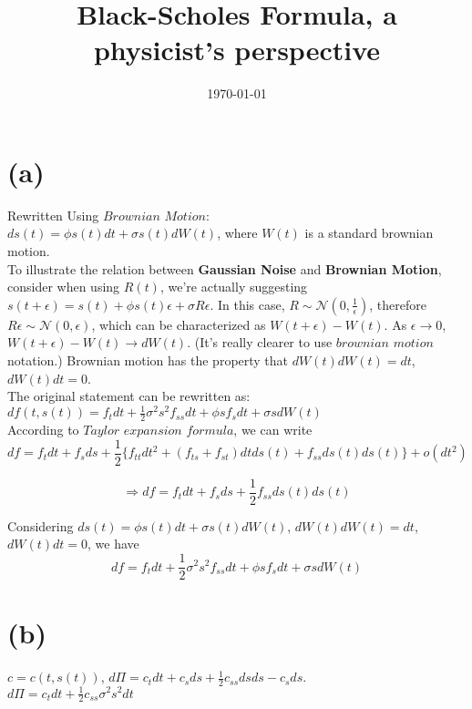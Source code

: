 \documentclass[12pt,a4paper]{paper}
\title{Black-Scholes Formula, a physicist's perspective}
\author{}
\date{\today}
\begin{document}
\maketitle

\section{(a)}
Rewritten Using $Brownian$ $Motion$: \\$ds(t) = \phi s(t) dt + \sigma s(t) dW(t)$, where $W(t)$ is a standard brownian motion.\\\indent To illustrate the relation between \textbf{Gaussian Noise} and \textbf{Brownian Motion}, consider when using $R(t)$, we're actually suggesting $s(t + \epsilon) = s(t) + \phi s(t) \epsilon + \sigma R \epsilon$. In this case, $R \sim \mathcal{N}(0, \frac{1}{\epsilon})$, therefore $R \epsilon \sim \mathcal{N}(0, \epsilon)$, which can be characterized as $W(t + \epsilon) - W(t)$. As $\epsilon \rightarrow 0$, $W(t + \epsilon) - W(t) \rightarrow dW(t)$. (It's really clearer to use $brownian$ $motion$ notation.) Brownian motion has the property that $dW(t)dW(t) = dt$, $dW(t) dt = 0$.\\
\indent The original statement can be rewritten as: \\$df(t, s(t)) = f_t dt + \frac{1}{2}\sigma^2s^2f_{ss}dt + \phi s f_s dt + \sigma s dW(t)$\\
\indent According to $Taylor$ $expansion$ $formula$, we can write
\begin{equation} 
df = f_t dt + f_s ds + \frac{1}{2}\{f_{tt} dt^2 + (f_{ts} + f_{st})dt ds(t) + f_{ss} ds(t)ds(t) \} + o(dt^2)
\end{equation} 

\begin{equation}
\Longrightarrow df = f_t dt + f_s ds + \frac{1}{2} f_{ss} ds(t)ds(t)
\end{equation}

\indent Considering $ds(t) = \phi s(t) dt + \sigma s(t) dW(t)$, $dW(t)dW(t) = dt$, $dW(t) dt = 0$, we have 
\begin{equation}
df = f_t dt + \frac{1}{2}\sigma^2s^2f_{ss}dt + \phi s f_s dt + \sigma s dW(t)
\end{equation}

\section{(b)}
$c = c(t, s(t))$, $d\Pi = c_t dt + c_s ds + \frac{1}{2}c_{ss} ds ds - c_s ds$.\\
$d\Pi = c_t dt + \frac{1}{2} c_{ss} \sigma^2 s^2 dt$
\end{document}

